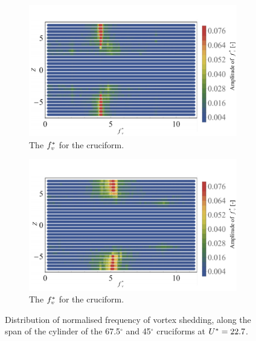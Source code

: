 \documentclass[oneside]{utmthesis}
\begin{document}
\begin{figure}[H]
  \centering

  \begin{subfigure}[h]{1\textwidth}
    \includegraphics[width=\textwidth]{figs/probe675YU10}
    \caption{The $f^{*}_{v}$ for the \angfo{} cruciform.}
    \label{fig:probe675YU10}
  \end{subfigure}

  \begin{subfigure}[h]{1\textwidth}
    \includegraphics[width=\textwidth]{figs/probe45YU10}
    \caption{The $f^{*}_{v}$ for the \angth{} cruciform.}
    \label{fig:probe45YU10}
  \end{subfigure}

  \caption{Distribution of normalised frequency of vortex shedding, along the span of the cylinder of the 67.5$^{\circ}$ and 45$^{\circ}$ cruciforms at $U^{*} = 22.7$.}
  \label{fig:probe67545YU10}
\end{figure}
\end{document}
